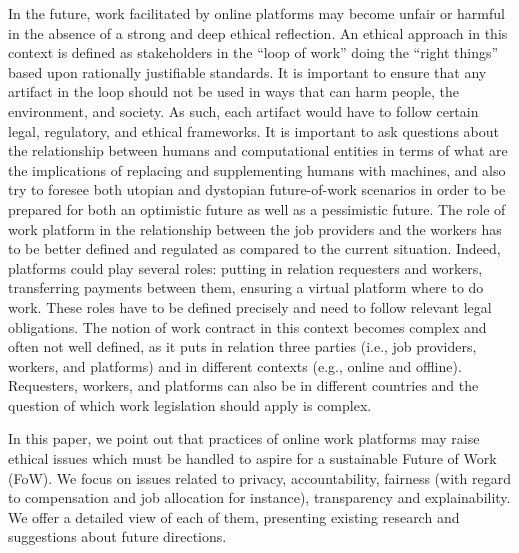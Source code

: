 \documentclass[11pt]{article}
\begin{document}
In the future, work facilitated by online platforms may become unfair or harmful in the absence of a strong and deep ethical reflection. An ethical approach in this context is defined as stakeholders in the ``loop of work'' doing the ``right things'' based upon rationally justifiable standards. It is important to ensure that any artifact in the loop should not be used in ways that can harm people, the environment, and society. As such, each artifact would have to follow certain legal, regulatory, and ethical frameworks. It is important to ask questions about the relationship between humans and computational entities in terms of what are the implications of replacing and supplementing humans with machines, and also try to foresee both utopian and dystopian future-of-work scenarios in order to be prepared for both an optimistic future as well as a pessimistic future. The role of work platform  in the relationship between the job providers and the workers has to be better defined and regulated as compared to the current situation. Indeed, platforms could play several roles: putting in relation requesters and workers, transferring payments between them, ensuring a virtual platform where to do work. These roles have to be defined precisely and need to follow relevant legal obligations. The notion of work contract in this context becomes complex and often not well defined, as it puts in relation three parties (i.e., job providers, workers, and platforms) and in different contexts (e.g., online and offline). Requesters, workers, and platforms can also be in different countries and the question of which work legislation should apply is complex.

In this paper, we point out that practices of online work platforms may raise ethical issues which must be handled to aspire for a sustainable Future of Work (FoW). We focus on issues related to privacy, accountability, fairness (with regard to compensation and job allocation for instance), transparency and explainability. We offer a detailed view of each of them, presenting existing research and suggestions about future directions.
\end{document}
